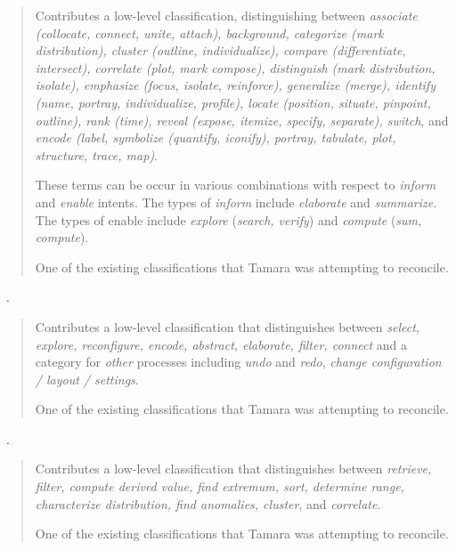 \begin{quotation}
    Contributes a low-level classification, distinguishing between {\it associate (collocate, connect, unite, attach), background, categorize (mark distribution), cluster (outline, individualize), compare (differentiate, intersect), correlate (plot, mark compose), distinguish (mark distribution, isolate), emphasize (focus, isolate, reinforce), generalize (merge), identify (name, portray, individualize, profile), locate (position, situate, pinpoint, outline), rank (time), reveal (expose, itemize, specify, separate), switch}, and {\it encode (label, symbolize (quantify, iconify), portray, tabulate, plot, structure, trace, map)}.
    
    These terms can be occur in various combinations with respect to {\it inform} and {\it enable} intents. 
    The types of {\it inform} include {\it elaborate} and {\it summarize}.
    The types of enable include {\it explore} ({\it search, verify}) and {\it compute} ({\it sum, compute}).
    
    One of the existing classifications that Tamara was attempting to reconcile.
\end{quotation}

\begin{sloppypar}
~\cite{Yi2007}. \end{sloppypar}

\begin{quotation}
    Contributes a low-level classification that distinguishes between {\it select, explore, reconfigure, encode, abstract, elaborate, filter, connect} and a category for {\it other} processes including {\it undo} and {\it redo}, {\it change configuration / layout / settings}.
    
    One of the existing classifications that Tamara was attempting to reconcile.
\end{quotation}

\begin{sloppypar}
~\cite{Amar2005}. \end{sloppypar}

\begin{quotation}
    Contributes a low-level classification that distinguishes between {\it retrieve, filter, compute derived value, find extremum, sort, determine range, characterize distribution, find anomalies, cluster}, and {\it correlate}.

    One of the existing classifications that Tamara was attempting to reconcile.
\end{quotation}


